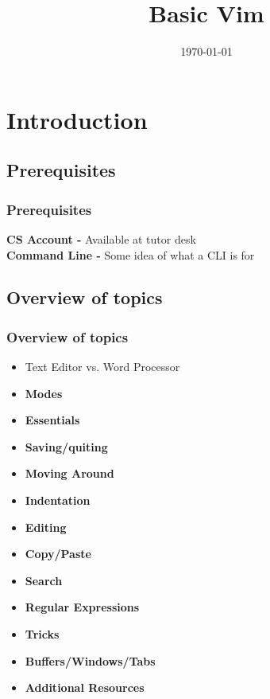 \documentclass{beamer}
\title{Basic Vim}
\date{\today}
\begin{document}
\frame{\titlepage}

\section{Introduction}
\subsection{Prerequisites}
\frame 
{
    \frametitle{Prerequisites}
    \textbf{CS Account -} Available at tutor desk \\
    \textbf{Command Line -} Some idea of what a CLI is for
}

\subsection{Overview of topics}
\frame
{
    \frametitle{Overview of topics}

    \begin{itemize}
        \item {Text Editor vs. Word Processor}\\
        \item \textbf{Modes}\\
        \item \textbf{Essentials}\\
            \item \textbf{Saving/quiting}\\
            \item \textbf{Moving Around}\\
            \item \textbf{Indentation}\\
            \item \textbf{Editing}\\
            \item \textbf{Copy/Paste}\\
            \item \textbf{Search}\\
            \item \textbf{Regular Expressions}\\
        \item \textbf{Tricks}\\
            \item \textbf{Buffers/Windows/Tabs}\\
        \item \textbf{Additional Resources}
    \end{itemize}
}
\end{document}

